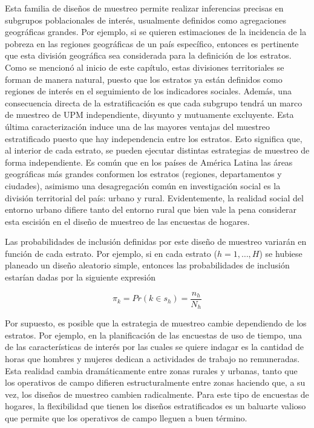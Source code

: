 \documentclass[12pt,spanish,]{book}
\begin{document}
Esta familia de diseños de muestreo permite realizar inferencias precisas en subgrupos poblacionales de interés, usualmente definidos como agregaciones geográficas grandes. Por ejemplo, si se quieren estimaciones de la incidencia de la pobreza en las regiones geográficas de un país específico, entonces es pertinente que esta división geográfica sea considerada para la definición de los estratos. Como se mencionó al inicio de este capítulo, estas divisiones territoriales se forman de manera natural, puesto que los estratos ya están definidos como regiones de interés en el seguimiento de los indicadores sociales. Además, una consecuencia directa de la estratificación es que cada subgrupo tendrá un marco de muestreo de UPM independiente, disyunto y mutuamente excluyente. Esta última caracterización induce una de las mayores ventajas del muestreo estratificado puesto que hay independencia entre los estratos. Esto significa que, al interior de cada estrato, se pueden ejecutar distintas estrategias de muestreo de forma independiente. Es común que en los países de América Latina las áreas geográficas más grandes conformen los estratos (regiones, departamentos y ciudades), asimismo una desagregación común en investigación social es la división territorial del país: urbano y rural. Evidentemente, la realidad social del entorno urbano difiere tanto del entorno rural que bien vale la pena considerar esta escisión en el diseño de muestreo de las encuestas de hogares.

Las probabilidades de inclusión definidas por este diseño de muestreo variarán en función de cada estrato. Por ejemplo, si en cada estrato (\(h=1, \ldots, H\)) se hubiese planeado un diseño aleatorio simple, entonces las probabilidades de inclusión estarían dadas por la siguiente expresión

\[\pi_k = Pr(k \in s_h) = \frac{n_h}{N_h}\]

Por supuesto, es posible que la estrategia de muestreo cambie dependiendo de los estratos. Por ejemplo, en la planificación de las encuestas de uso de tiempo, una de las características de interés por las cuales se quiere indagar es la cantidad de horas que hombres y mujeres dedican a actividades de trabajo no remuneradas. Esta realidad cambia dramáticamente entre zonas rurales y urbanas, tanto que los operativos de campo difieren estructuralmente entre zonas haciendo que, a su vez, los diseños de muestreo cambien radicalmente. Para este tipo de encuestas de hogares, la flexibilidad que tienen los diseños estratificados es un baluarte valioso que permite que los operativos de campo lleguen a buen término.
\end{document}
